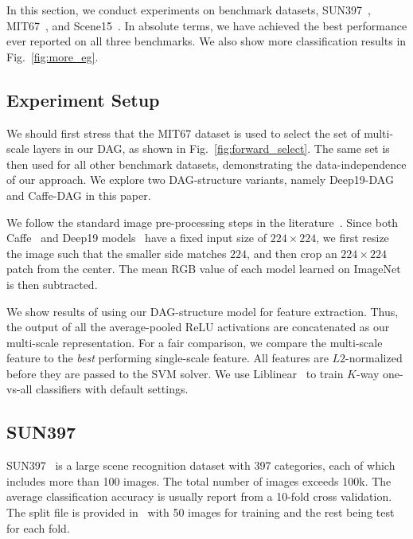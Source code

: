 \documentclass[10pt,twocolumn,letterpaper]{article}
\begin{document}
In this section, we conduct experiments on benchmark datasets, SUN397~\cite{SUN397}, MIT67~\cite{MIT67}, and Scene15~\cite{Scene15}. In absolute terms, we have achieved the best performance ever reported on all three benchmarks. We also show more classification results in Fig.~\ref{fig:more_eg}. 

\subsection{Experiment Setup}

We should first stress that the MIT67 dataset is used to select the set of multi-scale layers in our DAG, as shown in Fig.~\ref{fig:forward_select}. The same set is then used for all other benchmark datasets, demonstrating the data-independence of our approach. We explore two DAG-structure variants, namely Deep19-DAG and Caffe-DAG in this paper. %

We follow the standard image pre-processing steps in the literature~\cite{AlexNet,Caffe,veryDeep}. Since both Caffe~\cite{Caffe} and Deep19 models~\cite{veryDeep} have a fixed input size of $224\times 224$, we first resize the image such that the smaller side matches $224$, and then crop an $224\times 224$ patch from the center. The mean RGB value of each model learned on ImageNet~\cite{ImageNet} is then subtracted.  

We show results of using our DAG-structure model for feature extraction. Thus, the output of all the average-pooled ReLU activations are concatenated as our multi-scale representation. For a fair comparison, we compare the multi-scale feature to the {\em best} performing single-scale feature. All features are $L2$-normalized before they are passed to the SVM solver. We use Liblinear~\cite{liblinear} to train $K$-way one-vs-all classifiers with default settings.


\subsection{SUN397}

SUN397~\cite{SUN397} is a large scene recognition dataset with 397 categories, each of which includes more than 100 images. The total number of images exceeds 100k. The average classification accuracy is usually report from a 10-fold cross validation. The split file is provided in~\cite{SUN397} with 50 images for training and the rest being test for each fold.  
\end{document}
